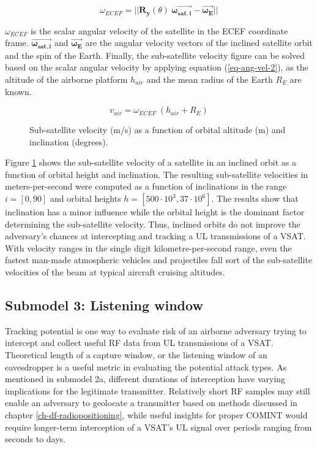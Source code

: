 \documentclass[english, 12pt, a4paper, elec, utf8, a-1b, online]{aaltothesis}
\begin{document}
\begin{equation*}
  \omega_{ECEF} =
  ||\bm{R_y}(\theta)\ \bm{\vec{\omega_{sat, i}}} - \bm{\vec{\omega_{E}}}||
\end{equation*}

$\omega_{ECEF}$ is the scalar angular velocity of the satellite in the ECEF coordinate frame.
$\bm{\vec{\omega_{sat, i}}}$ and $\bm{\vec{\omega_{E}}}$ are the angular velocity vectors of the inclined satellite orbit and the spin of the Earth.
Finally, the sub-satellite velocity figure can be solved based on the scalar angular velocity by applying equation (\ref{eq-ang-vel-2}), as the altitude of the airborne platform $h_{air}$ and the mean radius of the Earth $R_E$ are known.

\begin{equation}
  v_{air} = \omega_{ECEF}\ (h_{air} + R_E)
\end{equation}

\begin{figure}[h]
  \centering
  
  \caption{Sub-satellite velocity (m/s) as a function of orbital altitude (m) and inclination (degrees).}
  \label{fig-subsat-velocity-inclined}
\end{figure}
Figure \ref{fig-subsat-velocity-inclined} shows the sub-satellite velocity of a satellite in an inclined orbit as a function of orbital height and inclination.
The resulting sub-satellite velocities in meters-per-second were computed as a function of inclinations in the range $i = [0,90]$ and orbital heights $h = [500 \cdot 10^3, 37 \cdot 10^6]$.
The results show that inclination has a minor influence while the orbital height is the dominant factor determining the sub-satellite velocity.
Thus, inclined orbits do not improve the adversary's chances at intercepting and tracking a UL transmissions of a VSAT.
With velocity ranges in the single digit kilometre-per-second range, even the fastest man-made atmospheric vehicles and projectiles fall sort of the sub-satellite velocities of the beam at typical aircraft cruising altitudes.

\subsection{Submodel 3: Listening window} \label{ch-results-submodel-3-window}
Tracking potential is one way to evaluate risk of an airborne adversary trying to intercept and collect useful RF data from UL transmissions of a VSAT.
Theoretical length of a capture window, or the listening window of an eavesdropper is a useful metric in evaluating the potential attack types.
As mentioned in submodel 2a, different durations of interception have varying implications for the legitimate transmitter.
Relatively short RF samples may still enable an adversary to geolocate a transmitter based on methods discussed in chapter \ref{ch-df-radiopositioning}, while useful insights for proper COMINT would require longer-term interception of a VSAT's UL signal over periods ranging from seconds to days. %
\end{document}
